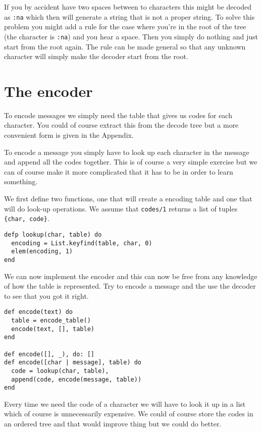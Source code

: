 \documentclass[a4paper,11pt]{article}
\begin{document}
If you by accident have two spaces between to characters this might be
decoded as {\tt :na} which then will generate a string that is not a
proper string. To solve this problem you might add a rule for the case
where you're in the root of the tree (the character is {\tt :na}) and
you hear a space. Then you simply do nothing and just start from the
root again. The rule can be made general so that any unknown character
will simply make the decoder start from the root.



\section{The encoder}

To encode messages we simply need the table that gives us codes for
each character. You could of course extract this from the decode tree
but a more convenient form is given in the Appendix. 

To encode a message you simply have to look up each character in the
message and append all the codes together. This is of course a very
simple exercise but we can of course make it more complicated that it
has to be in order to learn something.

We first define two functions, one that will create a encoding table
and one that will do look-up operations. We assume that {\tt codes/1}
returns a list of tuples {\tt\{char, code\}}.

\begin{verbatim}
defp lookup(char, table) do
  encoding = List.keyfind(table, char, 0)
  elem(encoding, 1)
end
\end{verbatim}

We can now implement the encoder and this can now be free from any
knowledge of how the table is represented. Try to encode a message and
the use the decoder to see that you got it right.

\begin{verbatim}
def encode(text) do
  table = encode_table()
  encode(text, [], table)
end

def encode([], _), do: []
def encode([char | message], table) do 
  code = lookup(char, table),
  append(code, encode(message, table))
end
\end{verbatim}

Every time we need the code of a character we will have
to look it up in a list which of course is unnecessarily expensive.  We
could of course store the codes in an ordered tree and that would
improve thing but we could do better.
\end{document}
